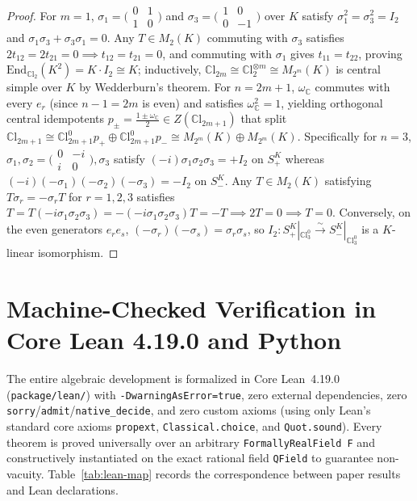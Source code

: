 \documentclass[11pt,a4paper]{article}
\theoremstyle{plain}
\theoremstyle{definition}
\newcommand{\CCl}{\mathbb{C}\mathrm{l}}
\newcommand{\End}{\mathrm{End}}
\newcommand{\C}{\mathbb{C}}
\begin{document}
\begin{proof}
For $m=1$, $\sigma_1 = \bigl(\begin{smallmatrix}0 & 1\\ 1 & 0\end{smallmatrix}\bigr)$ and $\sigma_3 = \bigl(\begin{smallmatrix}1 & 0\\ 0 & -1\end{smallmatrix}\bigr)$ over $K$ satisfy $\sigma_1^2 = \sigma_3^2 = I_2$ and $\sigma_1\sigma_3 + \sigma_3\sigma_1 = 0$. Any $T \in M_2(K)$ commuting with $\sigma_3$ satisfies $2 t_{12} = 2 t_{21} = 0 \implies t_{12} = t_{21} = 0$, and commuting with $\sigma_1$ gives $t_{11} = t_{22}$, proving $\End_{\CCl_2}(K^2) = K \cdot I_2 \cong K$; inductively, $\CCl_{2m} \cong \CCl_2^{\otimes m} \cong M_{2^m}(K)$ is central simple over $K$ by Wedderburn's theorem. For $n = 2m+1$, $\omega_{\C}$ commutes with every $e_r$ (since $n-1 = 2m$ is even) and satisfies $\omega_{\C}^2 = 1$, yielding orthogonal central idempotents $p_\pm = \frac{1 \pm \omega_{\C}}{2} \in Z(\CCl_{2m+1})$ that split $\CCl_{2m+1} \cong \CCl_{2m+1}^0 p_+ \oplus \CCl_{2m+1}^0 p_- \cong M_{2^m}(K) \oplus M_{2^m}(K)$. Specifically for $n=3$, $\sigma_1, \sigma_2 = \bigl(\begin{smallmatrix}0 & -i\\ i & 0\end{smallmatrix}\bigr), \sigma_3$ satisfy $(-i)\sigma_1\sigma_2\sigma_3 = +I_2$ on $S_+^K$ whereas $(-i)(-\sigma_1)(-\sigma_2)(-\sigma_3) = -I_2$ on $S_-^K$. Any $T \in M_2(K)$ satisfying $T \sigma_r = -\sigma_r T$ for $r=1,2,3$ satisfies $T = T(-i\sigma_1\sigma_2\sigma_3) = -(-i\sigma_1\sigma_2\sigma_3)T = -T \implies 2T = 0 \implies T = 0$. Conversely, on the even generators $e_r e_s$, $(-\sigma_r)(-\sigma_s) = \sigma_r\sigma_s$, so $I_2 : S_+^K|_{\CCl_3^0} \xrightarrow{\sim} S_-^K|_{\CCl_3^0}$ is a $K$-linear isomorphism.
\end{proof}

\section{Machine-Checked Verification in Core Lean 4.19.0 and Python}

The entire algebraic development is formalized in Core Lean~4.19.0 (\texttt{package/lean/}) with \texttt{-DwarningAsError=true}, zero external dependencies, zero \texttt{sorry}/\texttt{admit}/\texttt{native\_decide}, and zero custom axioms (using only Lean's standard core axioms \texttt{propext}, \texttt{Classical.choice}, and \texttt{Quot.sound}). Every theorem is proved universally over an arbitrary \texttt{FormallyRealField F} and constructively instantiated on the exact rational field \texttt{QField} to guarantee non-vacuity. Table~\ref{tab:lean-map} records the correspondence between paper results and Lean declarations.
\end{document}
